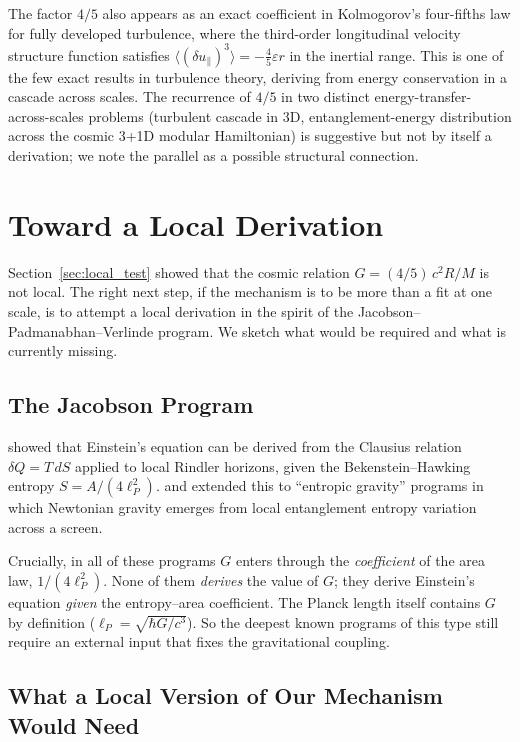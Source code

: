 \documentclass[11pt,letterpaper]{article}
\begin{document}
The factor $4/5$ also appears as an exact coefficient in Kolmogorov's
four-fifths law for fully developed turbulence, where the third-order
longitudinal velocity structure function satisfies
$\langle (\delta u_\parallel)^3 \rangle = -\frac{4}{5} \varepsilon r$
in the inertial range. This is one of the few exact results in
turbulence theory, deriving from energy conservation in a cascade
across scales. The recurrence of $4/5$ in two distinct
energy-transfer-across-scales problems (turbulent cascade in 3D,
entanglement-energy distribution across the cosmic 3+1D modular
Hamiltonian) is suggestive but not by itself a derivation; we note
the parallel as a possible structural connection.

\section{Toward a Local Derivation}
\label{sec:local_derivation}

Section~\ref{sec:local_test} showed that the cosmic relation
$G = (4/5)\, c^2 R/M$ is not local. The right next step, if the
mechanism is to be more than a fit at one scale, is to attempt a
local derivation in the spirit of the Jacobson--Padmanabhan--Verlinde
program. We sketch what would be required and what is currently
missing.

\subsection{The Jacobson Program}

\citet{jacobson1995} showed that Einstein's equation can be derived
from the Clausius relation $\delta Q = T\,dS$ applied to local
Rindler horizons, given the Bekenstein--Hawking entropy
$S = A/(4 \ell_P^2)$. \citet{padmanabhan2010} and \citet{verlinde2011}
extended this to ``entropic gravity'' programs in which Newtonian
gravity emerges from local entanglement entropy variation across a
screen.

Crucially, in all of these programs $G$ enters through the
\emph{coefficient} of the area law, $1/(4 \ell_P^2)$. None of them
\emph{derives} the value of $G$; they derive Einstein's equation
\emph{given} the entropy--area coefficient. The Planck length itself
contains $G$ by definition ($\ell_P = \sqrt{\hbar G/c^3}$). So the
deepest known programs of this type still require an external input
that fixes the gravitational coupling.

\subsection{What a Local Version of Our Mechanism Would Need}
\end{document}
